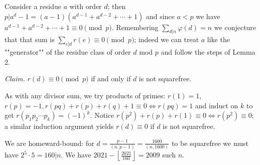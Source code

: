 \begin{solution}
	Consider a residue $a$ with order $d$; then $p| a^d - 1 = (a - 1)\left(a^{d - 1} + a^{d - 2} + \cdots + 1\right)$ and since $a < p$ we have $a^{d - 1} + a^{d - 2} + \cdots + 1 \equiv 0 \pmod{p}$. Remembering $\sum_{d|n} \varphi(d) = n$ we conjecture that that sum is $\sum_{e|d} r(e) \equiv 0 \pmod{p}$; indeed we can treat $a$ like the ""generator"" of the residue class of order $d$ mod $p$ and follow the steps of Lemma 2. \medskip
	
	\textit{Claim.} $r(d) \equiv 0 \pmod{p}$ if and only if $d$ is not squarefree. \medskip
	
	As with any divisor sum, we try products of primes: $r(1) = 1$, $r(p) = -1, r(pq) + r(p) + r(q) + 1 \equiv 0 \iff r(pq) = 1$ and induct on $k$ to get $r\left(p_1p_2 \cdots p_k\right) = (-1)^k$. Notice $r\left(p^2\right) + r(p) + r(1) \equiv 0 \iff r\left(p^2\right) \equiv 0$; a similar induction argument yields $r(d) \equiv 0$ if $d$ is not squarefree. 
	
	We are homeward-bound: for $d = \frac{p - 1}{(n, p - 1)} = \frac{1600}{(n, 1600)}$ to be squarefree we must have $2^5 \cdot 5 = 160 | n$. We have $2021 - \left\lfloor \frac{2021}{160} \right\rfloor = \boxed{2009}$ such $n$.
\end{solution}\newpage

